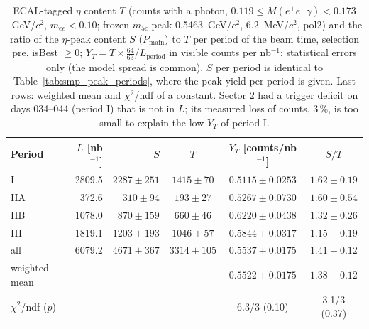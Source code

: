 \begin{table}[H]
\centering\small
\setlength{\tabcolsep}{4pt}
\caption{ECAL-tagged $\eta$ content $T$ (counts with a photon, $0.119\leq M(e^+e^-\gamma)<0.173$~GeV/$c^2$, $m_{ee}<0.10$; frozen $m_{5c}$ peak 0.5463~GeV/$c^2$, 6.2~MeV/$c^2$, pol2) and the ratio of the $\eta$-peak content $S$ ($P_\mathrm{main}$) to $T$ per period of the beam time, selection pre, isBest $\geq0$; $Y_T=T\times\frac{64}{63}/L_\mathrm{period}$ in visible counts per nb$^{-1}$; statistical errors only (the model spread is common). $S$ per period is identical to Table~\ref{tab:smp_peak_periods}, where the peak yield per period is given. Last rows: weighted mean and $\chi^2$/ndf of a constant. Sector 2 had a trigger deficit on days 034--044 (period I) that is not in $L$; its measured loss of counts, 3\,\%, is too small to explain the low $Y_T$ of period I.}
\label{tab:res_period}
\begin{tabular}{lrrccc}
\toprule
Period & $L$ [nb$^{-1}$] & $S$ & $T$ & $Y_T$ [counts/nb$^{-1}$] & $S/T$ \\
\midrule
I & 2809.5 & $2287\pm251$ & $1415\pm70$ & $0.5115\pm0.0253$ & $1.62\pm0.19$ \\
IIA & 372.6 & $310\pm94$ & $193\pm27$ & $0.5267\pm0.0730$ & $1.60\pm0.54$ \\
IIB & 1078.0 & $870\pm159$ & $660\pm46$ & $0.6220\pm0.0438$ & $1.32\pm0.26$ \\
III & 1819.1 & $1203\pm193$ & $1046\pm57$ & $0.5844\pm0.0317$ & $1.15\pm0.19$ \\
\midrule
all & 6079.2 & $4671\pm367$ & $3314\pm105$ & $0.5537\pm0.0175$ & $1.41\pm0.12$ \\
weighted mean & & & & $0.5522\pm0.0175$ & $1.38\pm0.12$ \\
$\chi^2$/ndf ($p$) & & & & 6.3/3 (0.10) & 3.1/3 (0.37) \\
\bottomrule
\end{tabular}
\end{table}
